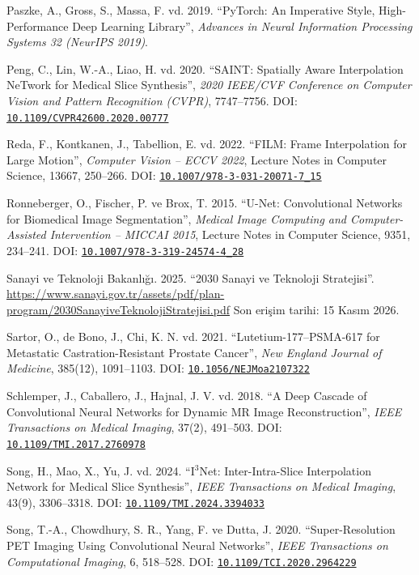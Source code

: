 \documentclass[11pt,a4paper]{article}
\newcommand{\doi}[1]{DOI: \href{https://doi.org/#1}{\nolinkurl{#1}}}
\begin{document}
\begin{list}{}{\setlength{\leftmargin}{1.5em}\setlength{\itemindent}{-1.5em}%
  \setlength{\itemsep}{0.25\baselineskip}\setlength{\parsep}{0pt}}
\item Paszke, A., Gross, S., Massa, F. vd. 2019. ``PyTorch: An Imperative Style,
High-Performance Deep Learning Library'', \emph{Advances in Neural Information Processing Systems
32 (NeurIPS 2019)}.

\item Peng, C., Lin, W.-A., Liao, H. vd. 2020. ``SAINT: Spatially Aware Interpolation NeTwork for
Medical Slice Synthesis'', \emph{2020 IEEE/CVF Conference on Computer Vision and Pattern
Recognition (CVPR)}, 7747--7756. \doi{10.1109/CVPR42600.2020.00777}

\item Reda, F., Kontkanen, J., Tabellion, E. vd. 2022. ``FILM: Frame Interpolation for Large
Motion'', \emph{Computer Vision -- ECCV 2022}, Lecture Notes in Computer Science, 13667,
250--266. \doi{10.1007/978-3-031-20071-7_15}

\item Ronneberger, O., Fischer, P. ve Brox, T. 2015. ``U-Net: Convolutional Networks for
Biomedical Image Segmentation'', \emph{Medical Image Computing and Computer-Assisted Intervention
-- MICCAI 2015}, Lecture Notes in Computer Science, 9351, 234--241.
\doi{10.1007/978-3-319-24574-4_28}

\item Sanayi ve Teknoloji Bakanlığı. 2025. ``2030 Sanayi ve Teknoloji Stratejisi''.
\url{https://www.sanayi.gov.tr/assets/pdf/plan-program/2030SanayiveTeknolojiStratejisi.pdf}
Son erişim tarihi: 15 Kasım 2026.

\item Sartor, O., de Bono, J., Chi, K. N. vd. 2021. ``Lutetium-177--PSMA-617 for Metastatic
Castration-Resistant Prostate Cancer'', \emph{New England Journal of Medicine}, 385(12),
1091--1103. \doi{10.1056/NEJMoa2107322}

\item Schlemper, J., Caballero, J., Hajnal, J. V. vd. 2018. ``A Deep Cascade of Convolutional
Neural Networks for Dynamic MR Image Reconstruction'', \emph{IEEE Transactions on Medical
Imaging}, 37(2), 491--503. \doi{10.1109/TMI.2017.2760978}

\item Song, H., Mao, X., Yu, J. vd. 2024. ``I$^3$Net: Inter-Intra-Slice Interpolation Network for
Medical Slice Synthesis'', \emph{IEEE Transactions on Medical Imaging}, 43(9), 3306--3318.
\doi{10.1109/TMI.2024.3394033}

\item Song, T.-A., Chowdhury, S. R., Yang, F. ve Dutta, J. 2020. ``Super-Resolution PET Imaging
Using Convolutional Neural Networks'', \emph{IEEE Transactions on Computational Imaging}, 6,
518--528. \doi{10.1109/TCI.2020.2964229}


\end{list}
\end{document}
